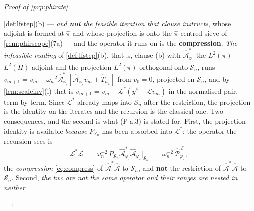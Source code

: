 \begin{proof}[Proof of \cref{prp:phirate}]
\begin{enumerate}
\cref{def:lfstep}\textup{(b)} --- \emph{and \textbf{not} the feasible iteration that clause instructs},
whose adjoint is formed at $\hat\pi$ and whose projection is onto the $\hat\pi$-centred sieve of
\cref{rem:phirscope}\textup{(7a)} --- and the operator it runs on is the
\textbf{compression}. \emph{The infeasible reading} of \cref{def:lfstep}(b), that is, clause \textup{(b)}
with $\hat{\mathcal A}^{\ast}_{\varphi_\circ}$ the $L^{2}(\pi)$--$L^{2}(\Pi)$ adjoint and the projection
$L^{2}(\pi)$-orthogonal onto $\mathcal S_n$, runs
$v_{m+1}=v_m-\omega_n^{-2}\hat{\mathcal A}^{\ast}_{\varphi_\circ}[\hat{\mathcal A}_{\varphi_\circ}v_m+\hat T_{h_x}]$
from $v_0=0$, projected on $\mathcal S_n$, and by \cref{lem:scaleinv}(i) that is
$v_{m+1}=v_m+\mathcal L^{\ast}(y^\delta-\mathcal Lv_m)$ in the normalised pair, term by term.
Since $\mathcal L^{\ast}$ already maps into $\mathcal S_n$ after the restriction, the projection is
the identity on the iterates and the recursion is the classical one.
Two consequences, and the second is what (P-a.3) is stated for. First, the projection identity is
available \emph{because} $P_{\mathcal S_n}$ has been absorbed into $\mathcal L^{\ast}$: the operator the
recursion sees is
\begin{equation}\label{eq:LstarL}
\mathcal L^{\ast}\mathcal L\;=\;\omega_n^{-2}\,P_{\mathcal S_n}\hat{\mathcal A}^{\ast}_{\varphi_\circ}\hat{\mathcal A}_{\varphi_\circ}\big\vert_{\mathcal S_n}
\;=\;\omega_n^{-2}\,\hat{\mathcal P}^{\,\mathcal S}_{\varphi_\circ} ,
\end{equation}
the \emph{compression} \eqref{eq:compress} of $\hat{\mathcal A}^{\ast}\hat{\mathcal A}$ to
$\mathcal S_n$, and \textbf{not} the restriction of $\hat{\mathcal A}^{\ast}\hat{\mathcal A}$ to
$\mathcal S_n$. Second, \emph{the two are not the same operator and their ranges are nested in neither
}
\end{enumerate}
\end{proof}
